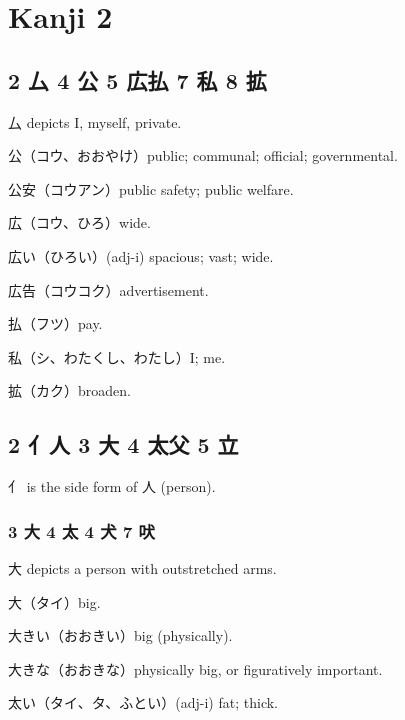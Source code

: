 \chapter{Kanji 2}

\section{2 厶 4 公 5 広払 7 私 8 拡}

厶 depicts I, myself, private.

公（コウ、おおやけ）public; communal; official; governmental.

公安（コウアン）public safety; public welfare.

広（コウ、ひろ）wide.

広い（ひろい）(adj-i) spacious; vast; wide.

広告（コウコク）advertisement.

払（フツ）pay.

私（シ、わたくし、わたし）I; me.

拡（カク）broaden.

\section{2 亻人 3 大 4 太父 5 立}

亻 is the side form of 人 (person).


\subsection{3 大 4 太 4 犬 7 吠}

大 depicts a person with outstretched arms.

大（タイ）big.

大きい（おおきい）big (physically).

大きな（おおきな）physically big, or figuratively important.



太い（タイ、タ、ふとい）(adj-i) fat; thick.

